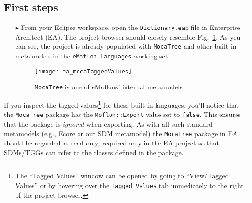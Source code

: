 \newpage
\hypertarget{initialize vis}{}
\subsection{First steps}
\visHeader

\begin{itemize}

\item[$\blacktriangleright$] From your Eclipse workspace, open the \texttt{Dict\-ion\-ary.eap} file in Enterprise Architect (EA). The project browser should
closely resemble Fig.~\ref{ea:mocaTagged}. As you can see, the project is already populated with \texttt{MocaTree} and other built-in metamodels
in the \texttt{eMoflon Languages} working set.

\vspace{0.5cm}

\begin{figure}[htpb]
\begin{center}
  \texttt{[image: ea\_mocaTaggedValues]}
  \caption{\texttt{MocaTree} is one of eMoflons' internal metamodels}
  \label{ea:mocaTagged}
\end{center}
\end{figure}

\end{itemize}

\vspace{-0.5cm}

If you inspect the tagged values\footnote{The ``Tagged Values'' window can be opened by going to ``View/Tagged Values'' or by hovering over the \texttt{Tagged
Values} tab immediately to the right of the project browser.} for these built-in languages, you'll notice that the \texttt{MocaTree} package has the
\texttt{Moflon::Export} value set to \texttt{false}. This ensures that the package is \emph{ignored} when exporting. As with all such standard metamodels (e.g.,
Ecore or our SDM metamodel) the \texttt{MocaTree} package in EA should be regarded as read-only, required only in the EA project so that SDMs/TGGs can refer to
the classes defined in the package.

